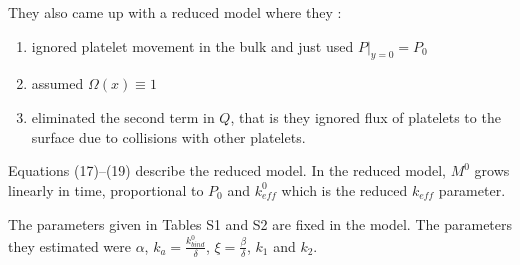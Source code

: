 \documentclass[
10pt, %
letterpaper, %
twocolumn, %
landscape %
]{article}
\begin{document}
They also came up with a reduced model where they :
\begin{enumerate}
\item ignored platelet movement in the bulk and just used $P|_{y=0} =
  P_0$
\item assumed $\Omega(x) \equiv 1$
\item eliminated the second term in $Q$, that is they ignored flux of
  platelets to the surface due to collisions with other platelets.
\end{enumerate}
Equations (17)--(19) describe the reduced model. In the reduced model,
$M^0$ grows linearly in time, proportional to $P_0$ and
$k_\textit{eff}^0$ which is the reduced $k_\textit{eff}$ parameter.

The parameters given in Tables S1 and S2 are fixed in the model. The
parameters they estimated were $\alpha$, $k_a =
\frac{k_\textit{bind}^0}{\delta}$, $\xi = \frac{\beta}{\delta}$,
$k_1$ and $k_2$. 





\end{document}
